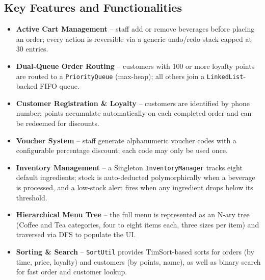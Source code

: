 \documentclass[11pt,a4paper]{article}
\begin{document}
\subsection{Key Features and Functionalities}
\begin{itemize}[leftmargin=*]
    \item \textbf{Active Cart Management} -- staff add or remove beverages before placing an order; every action is reversible via a generic undo/redo stack capped at 30 entries.
    \item \textbf{Dual-Queue Order Routing} -- customers with 100 or more loyalty points are routed to a \texttt{PriorityQueue} (max-heap); all others join a \texttt{LinkedList}-backed FIFO queue.
    \item \textbf{Customer Registration \& Loyalty} -- customers are identified by phone number; points accumulate automatically on each completed order and can be redeemed for discounts.
    \item \textbf{Voucher System} -- staff generate alphanumeric voucher codes with a configurable percentage discount; each code may only be used once.
    \item \textbf{Inventory Management} -- a Singleton \texttt{InventoryManager} tracks eight default ingredients; stock is auto-deducted polymorphically when a beverage is processed, and a low-stock alert fires when any ingredient drops below its threshold.
    \item \textbf{Hierarchical Menu Tree} -- the full menu is represented as an N-ary tree (Coffee and Tea categories, four to eight items each, three sizes per item) and traversed via DFS to populate the UI.
    \item \textbf{Sorting \& Search} -- \texttt{SortUtil} provides TimSort-based sorts for orders (by time, price, loyalty) and customers (by points, name), as well as binary search for fast order and customer lookup.
\end{itemize}
\end{document}
